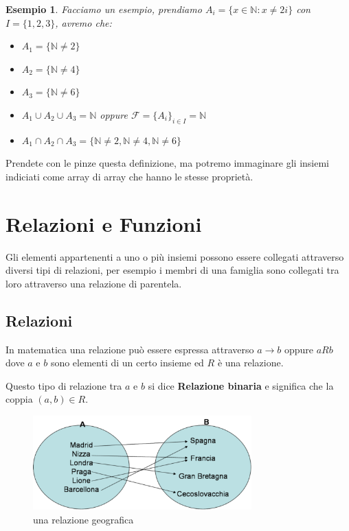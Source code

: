 \documentclass{article}
\newtheorem{exmp}{Esempio}[section]
\theoremstyle{definition}
\begin{document}
\begin{exmp}
Facciamo un esempio, prendiamo $A_i = \{x \in \mathbb{N} : x \not = 2i\}$ con $I = \{1,2,3\}$, avremo che:
\begin{itemize}
        \item $A_1 = \{\mathbb{N} \not = 2\}$
        \item $A_2 = \{\mathbb{N} \not = 4\}$
        \item $A_3 = \{\mathbb{N} \not = 6\}$
        \item $A_1 \cup A_2 \cup A_3 = \mathbb{N}$ oppure $\mathcal{F} = {\{A_i\}}_{i \in I} = \mathbb{N}$
        \item $A_1 \cap A_2 \cap A_3 = \{\mathbb{N} \not = 2, \mathbb{N} \not = 4, \mathbb{N} \not = 6\}$
\end{itemize}
\end{exmp} 
Prendete con le pinze questa definizione, ma potremo immaginare gli insiemi indiciati come array di array che hanno le stesse proprietà.




\newpage
\section{Relazioni e Funzioni}
Gli elementi appartenenti a uno o più insiemi possono essere collegati attraverso diversi tipi di relazioni, per esempio i membri di una famiglia sono collegati tra loro attraverso una relazione di parentela. \par


\subsection{Relazioni}
In matematica una relazione può essere espressa attraverso $ a \to b$ oppure $ a R b $ dove $ a $ e $ b $ sono elementi di un certo insieme ed $ R $ è una relazione. \par
Questo tipo di relazione tra $ a $ e $ b $ si dice \textbf{Relazione binaria} e significa che la coppia $ (a,b) \in R $. \par

\begin{figure}[h]
        \centering
                \includegraphics[width=0.75\textwidth]{relazioni.png}
        \caption{una relazione geografica}\label{fig:esempio_relazione}
\end{figure}
\end{document}
